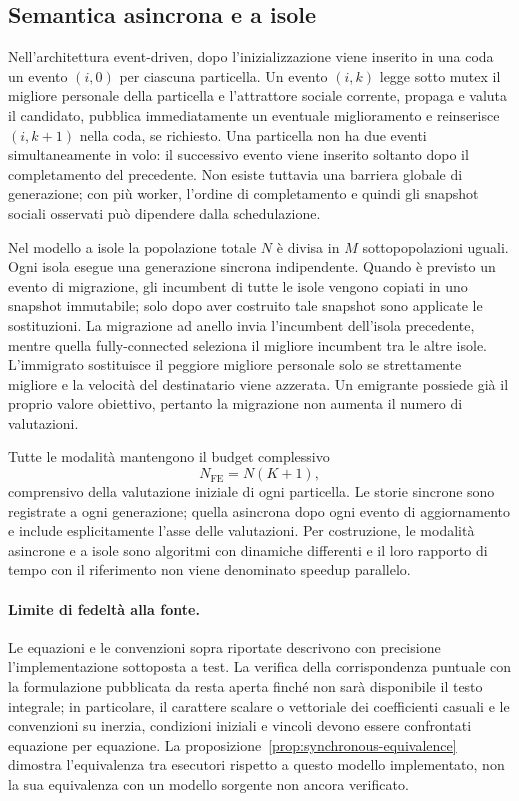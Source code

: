 \subsection{Semantica asincrona e a isole}

Nell'architettura event-driven, dopo l'inizializzazione viene inserito in una coda un evento $(i,0)$ per ciascuna particella. Un evento $(i,k)$ legge sotto mutex il migliore personale della particella e l'attrattore sociale corrente, propaga e valuta il candidato, pubblica immediatamente un eventuale miglioramento e reinserisce $(i,k+1)$ nella coda, se richiesto. Una particella non ha due eventi simultaneamente in volo: il successivo evento viene inserito soltanto dopo il completamento del precedente. Non esiste tuttavia una barriera globale di generazione; con più worker, l'ordine di completamento e quindi gli snapshot sociali osservati può dipendere dalla schedulazione.

Nel modello a isole la popolazione totale $N$ è divisa in $M$ sottopopolazioni uguali. Ogni isola esegue una generazione sincrona indipendente. Quando è previsto un evento di migrazione, gli incumbent di tutte le isole vengono copiati in uno snapshot immutabile; solo dopo aver costruito tale snapshot sono applicate le sostituzioni. La migrazione ad anello invia l'incumbent dell'isola precedente, mentre quella fully-connected seleziona il migliore incumbent tra le altre isole. L'immigrato sostituisce il peggiore migliore personale solo se strettamente migliore e la velocità del destinatario viene azzerata. Un emigrante possiede già il proprio valore obiettivo, pertanto la migrazione non aumenta il numero di valutazioni.

Tutte le modalità mantengono il budget complessivo
\begin{equation}
  N_{\mathrm{FE}}=N(K+1),
  \label{eq:fe-budget}
\end{equation}
comprensivo della valutazione iniziale di ogni particella. Le storie sincrone sono registrate a ogni generazione; quella asincrona dopo ogni evento di aggiornamento e include esplicitamente l'asse delle valutazioni. Per costruzione, le modalità asincrone e a isole sono algoritmi con dinamiche differenti e il loro rapporto di tempo con il riferimento non viene denominato speedup parallelo.

\paragraph{Limite di fedeltà alla fonte.}
Le equazioni e le convenzioni sopra riportate descrivono con precisione l'implementazione sottoposta a test. La verifica della corrispondenza puntuale con la formulazione pubblicata da \citet{Orlando2021} resta aperta finché non sarà disponibile il testo integrale; in particolare, il carattere scalare o vettoriale dei coefficienti casuali e le convenzioni su inerzia, condizioni iniziali e vincoli devono essere confrontati equazione per equazione. La proposizione~\ref{prop:synchronous-equivalence} dimostra l'equivalenza tra esecutori rispetto a questo modello implementato, non la sua equivalenza con un modello sorgente non ancora verificato.
